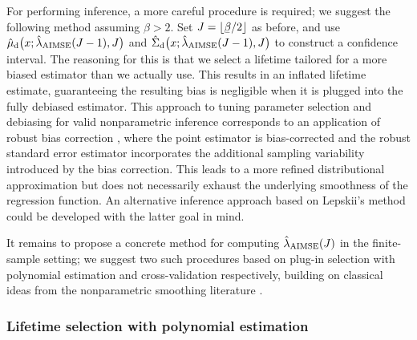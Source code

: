 For performing inference, a more careful procedure is required;
we suggest the following method assuming $\beta > 2$.
Set $J = \lfloor \flbeta / 2 \rfloor$ as before,
and use $\hat\mu_{\mathrm{d}}\big(x; \hat\lambda_{\operatorname{AIMSE}}(J-1), J\big)$
and $\hat\Sigma_{\mathrm{d}}\big(x; \hat\lambda_{\operatorname{AIMSE}}(J-1), J\big)$
to construct a confidence interval.
The reasoning for this is that we select a lifetime tailored for a more biased
estimator than we actually use. This results in an inflated lifetime estimate,
guaranteeing the resulting bias is negligible when it is plugged into the fully
debiased estimator. This approach to tuning parameter selection and debiasing
for valid nonparametric inference corresponds to an application of robust bias
correction \citep{calonico2018effect,calonico2022coverage},
where the point estimator is bias-corrected
and the robust standard error estimator incorporates the additional
sampling variability introduced by the bias correction.
This leads to a more refined distributional approximation
but does not necessarily exhaust the underlying
smoothness of the regression function.
An alternative inference approach based on Lepskii's method
\citep{lepskii1992asymptotically,birge2001alternative}
could be developed with the latter goal in mind.

It remains to propose a concrete method for computing $\hat\lambda_{\operatorname{AIMSE}}(J)$
in the finite-sample setting; we suggest two such procedures based on plug-in
selection with polynomial estimation and cross-validation respectively,
building on classical ideas from the nonparametric
smoothing literature \citep{fan2020statistical}.

\subsubsection*{Lifetime selection with polynomial estimation}

